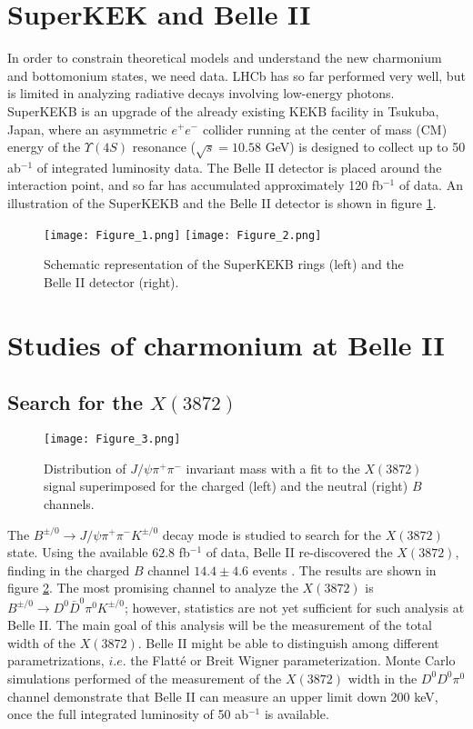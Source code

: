\documentclass[border=2mm]{article}
\begin{document}
\section{SuperKEK and Belle II}
In order to constrain theoretical models and understand the new charmonium and bottomonium states, we need data. LHCb has so far performed very well, but is limited in analyzing radiative decays involving low-energy photons.  
SuperKEKB \cite{ref:superkekb} is an upgrade of the already existing KEKB facility in Tsukuba, Japan, where an asymmetric $e^{+}e^{-}$ collider running at the center of mass (CM) energy of the  $\Upsilon(4S)$ resonance ($\sqrt{s}= 10.58$ GeV) is designed to collect up to 50 ab$^{-1}$ of integrated luminosity data. The Belle II \cite{ref:belleii} detector is placed around the interaction point, and so far has accumulated approximately 120 fb$^{-1}$ of data. An illustration of the SuperKEKB and the Belle II detector is shown in figure \ref{fig:kek}.   
\begin{figure}[h]
  \centering
  \texttt{[image: Figure\_1.png]}
  \texttt{[image: Figure\_2.png]}
  \caption{Schematic representation of the SuperKEKB rings (left) and the Belle II detector (right).}
  \label{fig:kek}
\end{figure}

\section{Studies of charmonium at Belle II}

\subsection{Search for the $X(3872)$}
\begin{figure}[H]
  \centering
  \texttt{[image: Figure\_3.png]}
  \caption{Distribution of $J/\psi \pi^{+} \pi^{-}$ invariant mass with a fit to the $X(3872)$ signal superimposed for the charged (left) and the neutral (right) $B$ channels.}
  \label{fig:x3872}
\end{figure}
The $B^{\pm/0} \to J/\psi \pi^{+} \pi^{-} K^{\pm/0}$ decay mode is studied to search for the $X(3872)$ state. Using the available $62.8$ fb$^{-1}$ of data, Belle II re-discovered the  $X(3872)$, finding in the charged $B$ channel  $14.4 \pm 4.6$ events \cite{ref:belleiiphybook}. The results are shown in figure \ref{fig:x3872}. The most promising channel to analyze the $X(3872)$ is $B^{\pm/0} \to D^0 \bar D^0 \pi^0 K^{\pm/0}$; however, statistics are not yet sufficient for such analysis at Belle II. The main goal of this analysis will be the measurement of the total width of the $X(3872)$.
Belle II might be able to distinguish among different parametrizations, $i.e.$ the Flatt\'e or Breit Wigner parameterization.  Monte Carlo simulations performed of the measurement
of the $X(3872)$ width in the $D^{0} D^{0} \pi^{0}$ channel demonstrate that Belle II can measure an upper limit down 200 keV, once the full integrated luminosity of
50 ab$^{-1}$ is available.
\end{document}
